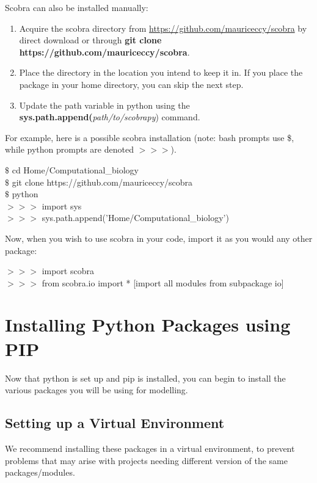 Scobra can also be installed manually:
\begin{enumerate}
\item Acquire the scobra directory from \url{https://github.com/mauriceccy/scobra} by direct download or through \textbf{git clone \\https://github.com/mauriceccy/scobra}.
\item Place the directory in the location you intend to keep it in. If you place the package in your home directory, you can skip the next step.
\item Update the path variable in python using the\\
\textbf{sys.path.append(}\textit{path/to/scobrapy}) command.
\end{enumerate}

For example, here is a possible scobra installation (note: bash prompts use \$, while python prompts are denoted $>>>$).
\begin{framed}
$\$$ cd Home/Computational\_biology\\
$\$$ git clone https://github.com/mauriceccy/scobra\\
$\$$ python\\
$>>>$ import sys\\
$>>>$ sys.path.append('Home/Computational\_biology')
\end{framed}

Now, when you wish to use scobra in your code, import it as you would any other package:

\begin{framed}
$>>>$ import scobra\\
$>>>$ from scobra.io import * [import all modules from subpackage io]
\end{framed}


\section{Installing Python Packages using PIP}

Now that python is set up and pip is installed, you can begin to install the various packages you will be using for modelling. \\

\subsection{Setting up a Virtual Environment}
We recommend installing these packages in a virtual environment, to prevent problems that may arise with projects needing different version of the same packages/modules. \\

